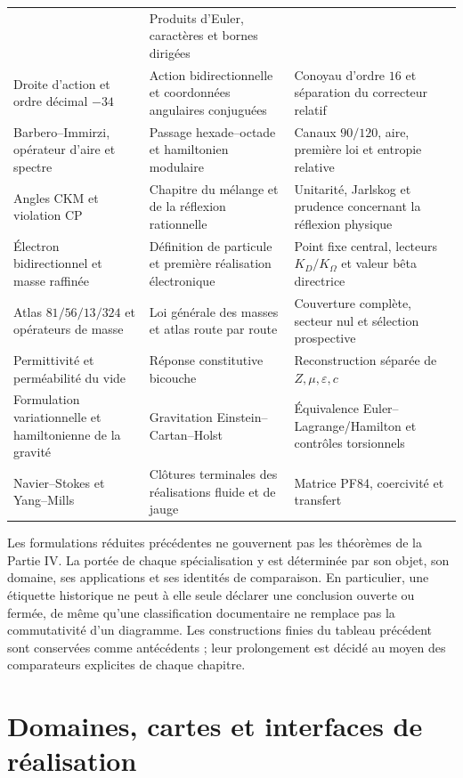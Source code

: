 \begin{longtable}{@{}>{\raggedright\arraybackslash}p{}
  >{\raggedright\arraybackslash}p{}
  >{\raggedright\arraybackslash}p{}@{}}
& Produits d'Euler, caractères et bornes dirigées\\
Droite d'action et ordre décimal \(-34\)
& Action bidirectionnelle et coordonnées angulaires conjuguées
& Conoyau d'ordre $16$ et séparation du correcteur relatif\\
Barbero--Immirzi, opérateur d'aire et spectre
& Passage hexade--octade et hamiltonien modulaire
& Canaux $90/120$, aire, première loi et entropie relative\\
Angles CKM et violation CP
& Chapitre du mélange et de la réflexion rationnelle
& Unitarité, Jarlskog et prudence concernant la réflexion physique\\
Électron bidirectionnel et masse raffinée
& Définition de particule et première réalisation électronique
& Point fixe central, lecteurs $K_D/K_\Omega$ et valeur bêta directrice\\
Atlas \(81/56/13/324\) et opérateurs de masse
& Loi générale des masses et atlas route par route
& Couverture complète, secteur nul et sélection prospective\\
Permittivité et perméabilité du vide
& Réponse constitutive bicouche
& Reconstruction séparée de \(Z,\mu,\varepsilon,c\)\\
Formulation variationnelle et hamiltonienne de la gravité
& Gravitation Einstein--Cartan--Holst
& Équivalence Euler--Lagrange/Hamilton et contrôles torsionnels\\
Navier--Stokes et Yang--Mills
& Clôtures terminales des réalisations fluide et de jauge
& Matrice PF84, coercivité et transfert\\
\bottomrule
\end{longtable}
\endgroup

Les formulations réduites précédentes ne gouvernent pas les théorèmes de la
Partie IV. La portée de chaque spécialisation y est déterminée par son objet,
son domaine, ses applications et ses identités de comparaison. En particulier, une
étiquette historique ne peut à elle seule déclarer une conclusion ouverte ou
fermée, de même qu'une classification documentaire ne remplace pas la
commutativité d'un diagramme. Les constructions finies du tableau précédent
sont conservées comme antécédents ; leur prolongement est décidé au moyen des
comparateurs explicites de chaque chapitre.

\chapter{Domaines, cartes et interfaces de réalisation}
\label{app:dominios-cartas-interfaces-acumulativo}

